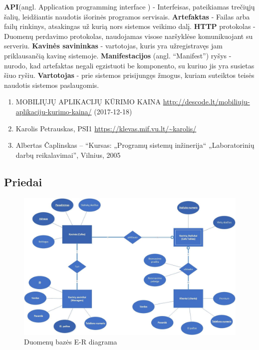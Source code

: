 \documentclass{VUMIFPSkursinis}
\begin{document}
{{{{{
\noindent

\textbf{API}(angl. Application programming interface ) - Interfeisas, pateikiamas trečiųjų šalių, leidžiantis naudotis išorinės programos servisais.
\newline
\textbf{Artefaktas} - Failas arba failų rinkinys, atsakingas už kurią nors sistemos veikimo dalį. 
\newline
\textbf{HTTP} protokolas - Duomenų perdavimo protokolas, naudojamas visose naršyklėse komunikuojant su serveriu.
\newline
\textbf{Kavinės savininkas} - vartotojas, kuris yra užregistravęs jam priklausančią kavinę sistemoje.
\newline
\textbf{Manifestacijos} (angl. “Manifest”) ryšys - nurodo, kad artefaktas negali egzistuoti be komponento, su kuriuo jis yra susietas šiuo ryšiu.
\newline
\textbf{Vartotojas} - prie sistemos prisijungęs žmogus, kuriam suteiktos teisės naudotis sistemos paslaugomis.
\newline

\begin{enumerate}
\item MOBILIŲJŲ APLIKACIJŲ KŪRIMO KAINA
\url {http://descode.lt/mobiliuju-aplikaciju-kurimo-kaina/} (2017-12-18)
\item Karolis Petrauskas, PSI1
\url{https://klevas.mif.vu.lt/~karolis/}
\item Albertas Čaplinskas – “Kursas: „Programų sistemų inžinerija“ „Laboratorinių darbų
reikalavimai”, Vilnius, 2005
\end{enumerate}



\begin{landscape}
\section{Priedai}
	\begin {figure}[H]
		\includegraphics[width=1.3\textwidth,height=1.4\textheight,keepaspectratio]{img/ER}
		\caption{Duomenų bazės E-R diagrama}
		\label{fig:ER}
	\end{figure}
	

\end{landscape}}}}}}
\end{document}
